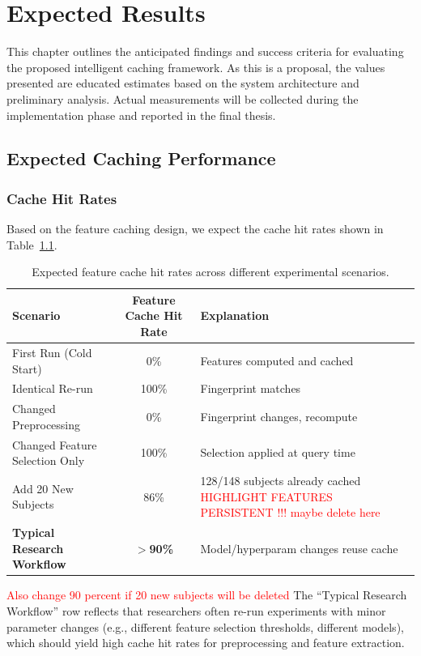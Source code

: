 \chapter{Expected Results}


This chapter outlines the anticipated findings and success criteria for evaluating the proposed intelligent caching framework. As this is a proposal, the values presented are educated estimates based on the system architecture and preliminary analysis. Actual measurements will be collected during the implementation phase and reported in the final thesis.

\section{Expected Caching Performance}

\subsection{Cache Hit Rates}

Based on the feature caching design, we expect the cache hit rates shown in Table~\ref{tab:expected_hit_rates}.

\begin{table}[ht]
\centering
\begin{tabular}{|l|c|l|}
\hline
\textbf{Scenario} & \textbf{Feature Cache Hit Rate} & \textbf{Explanation} \\
\hline
First Run (Cold Start) & 0\% & Features computed and cached \\
\hline
Identical Re-run & 100\% & Fingerprint matches \\
\hline
Changed Preprocessing & 0\% & Fingerprint changes, recompute \\
\hline
Changed Feature Selection Only & 100\% & Selection applied at query time \\
\hline
Add 20 New Subjects & 86\% & 128/148 subjects already cached \textcolor{red}{HIGHLIGHT FEATURES PERSISTENT !!! maybe delete here}  \\
\hline
\textbf{Typical Research Workflow} & \textbf{$>$90\%} & Model/hyperparam changes reuse cache \\
\hline
\end{tabular}
\caption{Expected feature cache hit rates across different experimental scenarios.}
\label{tab:expected_hit_rates}
\end{table}
\textcolor{red}{Also change 90 percent if 20 new subjects will be deleted }
The ``Typical Research Workflow'' row reflects that researchers often re-run experiments with minor parameter changes (e.g., different feature selection thresholds, different models), which should yield high cache hit rates for preprocessing and feature extraction.

